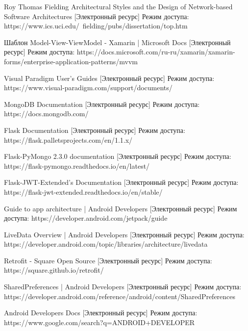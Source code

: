 \begingroup 
\renewcommand{\section}[2]{\anonsection{список использованных источников}}
\begin{thebibliography}{00}
	
Roy Thomas Fielding
Architectural Styles and the Design of Network-based Software Architectures
[Электронный ресурс] 
Режим доступа: https://www.ics.uci.edu/~fielding/pubs/dissertation/top.htm

Шаблон Model-View-ViewModel - Xamarin | Microsoft Docs
[Электронный ресурс]
Режим доступа:
https://docs.microsoft.com/ru-ru/xamarin/xamarin-forms/enterprise-application-patterns/mvvm

Visual Paradigm User's Guides
[Электронный ресурс]
Режим доступа:
https://www.visual-paradigm.com/support/documents/

MongoDB Documentation 
[Электронный ресурс]
Режим доступа:
https://docs.mongodb.com/

Flask Documentation
[Электронный ресурс] 
Режим доступа:
https://flask.palletsprojects.com/en/1.1.x/

Flask-PyMongo 2.3.0 documentation
[Электронный ресурс]
Режим доступа:
https://flask-pymongo.readthedocs.io/en/latest/

Flask-JWT-Extended’s Documentation
[Электронный ресурс] 
Режим доступа:
https://flask-jwt-extended.readthedocs.io/en/stable/

Guide to app architecture | Android Developers
[Электронный ресурс]
Режим доступа:
https://developer.android.com/jetpack/guide

LiveData Overview | Android Developers
[Электронный ресурс]
Режим доступа:
https://developer.android.com/topic/libraries/architecture/livedata

Retrofit - Square Open Source
[Электронный ресурс]
Режим доступа:
https://square.github.io/retrofit/


SharedPreferences | Android Developers
[Электронный ресурс]
Режим доступа:
https://developer.android.com/reference/android/content/SharedPreferences

Android Developers Docs
[Электронный ресурс]
Режим доступа:
https://www.google.com/search?q=ANDROID+DEVELOPER

\end{thebibliography}

\endgroup

\clearpage
